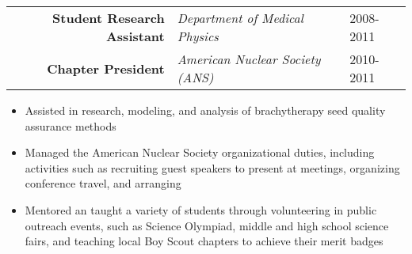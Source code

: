 
\begin{minipage}{\textwidth}
	\begin{center}
		\begin{tabular}{rll}
			\textbf{Student Research Assistant} & \textit{Department of Medical Physics} & 2008-2011 \\
			\textbf{Chapter President} & \textit{American Nuclear Society (ANS)} & 2010-2011 \\
		\end{tabular}
	\end{center}
\end{minipage}

\begin{minipage}{\textwidth}
	\begin{itemize}
		\item Assisted in research, modeling, and analysis of brachytherapy seed quality assurance methods
		\item Managed the American Nuclear Society organizational duties, including activities such as recruiting guest speakers to present at meetings,
			organizing conference travel, and arranging 
		\item Mentored an taught a variety of students through volunteering in public outreach events, such as Science Olympiad, middle and 
			high school science fairs, and teaching local Boy Scout chapters to achieve their merit badges
	\end{itemize}
\end{minipage}
